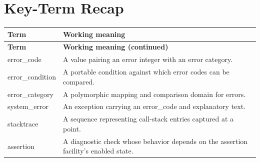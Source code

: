 \documentclass[11pt,letterpaper]{article}
\begin{document}
\section{Key-Term Recap}
\begin{longtable}{@{}>{\RaggedRight\arraybackslash}p{}>{\RaggedRight\arraybackslash}p{}@{}}\toprule\textbf{Term} & \textbf{Working meaning}\\\midrule\endfirsthead\toprule\textbf{Term} & \textbf{Working meaning (continued)}\\\midrule\endhead\bottomrule\endfoot
error\_\allowbreak{}code & A value pairing an error integer with an error category.\\
error\_\allowbreak{}condition & A portable condition against which error codes can be compared.\\
error\_\allowbreak{}category & A polymorphic mapping and comparison domain for errors.\\
system\_\allowbreak{}error & An exception carrying an error\_\allowbreak{}code and explanatory text.\\
stacktrace & A sequence representing call-stack entries captured at a point.\\
assertion & A diagnostic check whose behavior depends on the assertion facility's enabled state.\\
\end{longtable}
\end{document}
